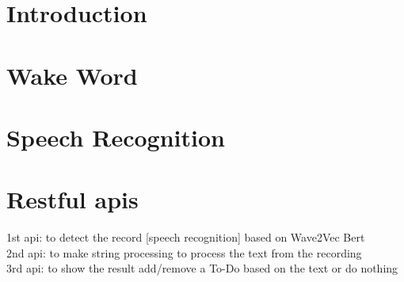 \documentclass[fleqn,10pt]{SelfArx} %
\affiliation{\textsuperscript{1}\textit{MIU, Computer Science}} %
\begin{document}
\maketitle %

\tableofcontents %

\thispagestyle{empty} %


\section*{Introduction} %






\section{Wake Word}


\section{Speech Recognition}



\section{Restful apis}

1st api: to detect the record [speech recognition] based on Wave2Vec Bert \\
2nd api: to make string processing to process the text from the recording  \\
3rd api: to show the result add/remove a To-Do based on the text or do nothing
\end{document}
